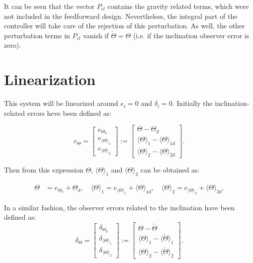 \documentclass[main.tex]{subfiles}
\begin{document}
	It can be seen that the vector $P_{cl}$ contains the gravity related terms, which were not included in the feedforward design. Nevertheless, the integral part of the controller will take care of the rejection of this perturbation. As well, the other perturbation terms in $P_{cl}$ vanish if $\check{\Theta} = \Theta$ (i.e. if the inclination observer error is zero).
	
	\newpage

	\section{Linearization}
	
	This system will be linearized around $e_i = 0$ and $\delta_i = 0$. Initially the inclination-related errors heve been defined as:
	
	
	\begin{equation}
	e_\Theta = \begin{bmatrix}
	e_{\Theta_0} \\
	e_{\langle \Theta \rangle_1} \\
	e_{\langle \Theta \rangle_2}
	\end{bmatrix} := \begin{bmatrix}
	\Theta - \Theta_d \\
	\langle \Theta \rangle_1 - \langle \Theta \rangle_{1d} \\
	\langle \Theta \rangle_2 - \langle \Theta \rangle_{2d} 
	\end{bmatrix}.
	\end{equation}
	
	Then from this expression $\Theta$, $\langle \Theta \rangle_1$ and $\langle \Theta \rangle_2 $ can be obtained as:
	
	\begin{align}
	\Theta &= e_{\Theta_0} + \Theta_d,\quad \langle \Theta \rangle_1 = e_{\langle \Theta \rangle_1} + \langle \Theta \rangle_{1d},\quad \langle \Theta \rangle_2 = e_{\langle \Theta \rangle_2} + \langle \Theta \rangle_{2d}.
	\label{eq:theta}
	\end{align}
	
	In a similar fashion, the observer errors related to the inclination have been defined as:
	\begin{equation}
	\delta_\Theta = \begin{bmatrix}
	\delta_{\Theta_0} \\
	\delta_{\langle \Theta \rangle_1} \\
	\delta_{\langle \Theta \rangle_2}
	\end{bmatrix} := \begin{bmatrix}
	\Theta - \check{\Theta} \\
	\langle \Theta \rangle_1 - \langle \check{\Theta} \rangle_{1} \\
	\langle \Theta \rangle_2 - \langle \check{\Theta} \rangle_{2} 
	\end{bmatrix}.
	\label{eq:observererror}
	\end{equation}
	
\end{document}
